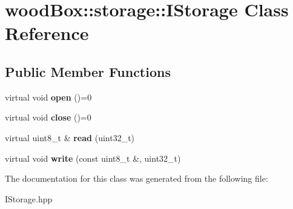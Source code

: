 \hypertarget{classwood_box_1_1storage_1_1_i_storage}{}\section{wood\+Box\+:\+:storage\+:\+:I\+Storage Class Reference}
\label{classwood_box_1_1storage_1_1_i_storage}
\subsection*{Public Member Functions}
\begin{DoxyCompactItemize}
\item 
\mbox{\label{classwood_box_1_1storage_1_1_i_storage_adb8657e4c30305a47304b07aae6a7f59}} 
virtual void {\bfseries open} ()=0
\item 
\mbox{\label{classwood_box_1_1storage_1_1_i_storage_a2ea20fc52d804d81298a1fe464db39d4}} 
virtual void {\bfseries close} ()=0
\item 
\mbox{\label{classwood_box_1_1storage_1_1_i_storage_a801ac9f87f83d8cec9eab3e3f041b33b}} 
virtual uint8\+\_\+t \& {\bfseries read} (uint32\+\_\+t)
\item 
\mbox{\label{classwood_box_1_1storage_1_1_i_storage_aca2bdba655c60d6331ee1d0fb0389414}} 
virtual void {\bfseries write} (const uint8\+\_\+t \&, uint32\+\_\+t)
\end{DoxyCompactItemize}


The documentation for this class was generated from the following file\+:\begin{DoxyCompactItemize}
\item 
I\+Storage.\+hpp\end{DoxyCompactItemize}
